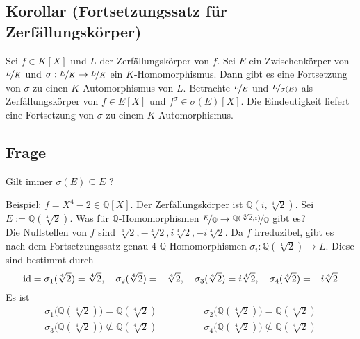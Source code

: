 \subsection{Korollar (Fortsetzungssatz für Zerfällungskörper)} %
\label{sub:1413}
Sei $f \in K[X]$ und $L$ der Zerfällungskörper von $f$. Sei $E$ ein Zwischenkörper von $\nicefrac{L}{K}$ und $\sigma : \nicefrac{E}{K} \to \nicefrac{L}{K}$ ein
$K$-Homomorphismus. Dann gibt es eine Fortsetzung von $\sigma$ zu einen $K$-Automorphismus von $L$.
Betrachte $\nicefrac{L}{E}$ und $\nicefrac{L}{\sigma(E)}$ als Zerfällungskörper von $f \in E[X]$ und $f^\sigma \in \sigma(E)[X]$. Die Eindeutigkeit liefert eine
Fortsetzung von $\sigma$ zu einem $K$-Automorphismus. \bewende

\subsection[Frage: Sind Zwischenkörper invariant unter Körperautomorphismen?]{Frage} %
\label{sub:1414}
Gilt immer $\sigma(E) \subseteq E$ ?

\uline{Beispiel:} $f=X^4-2 \in \mathds{Q}[X]$. Der Zerfällungskörper ist $\mathds{Q}(i, \sqrt[4]{2}  )$. Sei $E := \mathds{Q}(\sqrt[4]{2}  )$. Was für $\mathds{Q}$-Homomorphismen $\nicefrac{E}{\mathds{Q}} \to \nicefrac{\mathds{Q}(\sqrt[4]{2},i)}{\mathds{Q}}$ gibt es? \\
Die Nullstellen von $f$ sind $\sqrt[4]{2}  ,  - \sqrt[4]{2}  ,  i \sqrt[4]{2} ,  -i \sqrt[4]{2}$.	
Da $f$ irreduzibel, gibt es nach dem Fortsetzungssatz genau 4 $\mathds{Q}$-Homomorphismen $\sigma_i : \mathds{Q}(\sqrt[4]{2}  ) \to L$. Diese sind bestimmt durch
\[
	\id = \sigma_1(\sqrt[4]{2}) = \sqrt[4]{2} ,\quad  \sigma_2(\sqrt[4]{2}) = - \sqrt[4]{2} ,\quad   \sigma_3(\sqrt[4]{2})= i \sqrt[4]{2},\quad  \sigma_4(\sqrt[4]{2})= -i \sqrt[4]{2}
\]
Es ist
\[
\begin{array}{ll}
	\sigma_1\big(\mathds{Q}(\sqrt[4]{2})\big) = \mathds{Q}(\sqrt[4]{2})\qquad \qquad  &
	\sigma_2\big(\mathds{Q}(\sqrt[4]{2})\big) = \mathds{Q}(\sqrt[4]{2}) \\
	\sigma_3\big(\mathds{Q}(\sqrt[4]{2})\big) \nsubseteq \mathds{Q}(\sqrt[4]{2})\qquad  &
	\sigma_4\big(\mathds{Q}(\sqrt[4]{2})\big) \nsubseteq \mathds{Q}(\sqrt[4]{2})
\end{array}
\]

